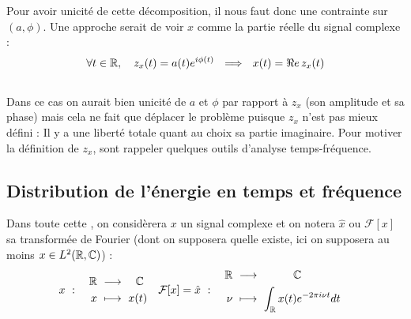 Pour avoir unicité de cette décomposition, il nous faut donc une contrainte sur $(a,\phi)$. Une approche serait de voir $x$ comme la partie réelle du signal complexe :
\[\forall t\in\R,\quad z_x(t) = a(t)e^{i\phi(t)}\ \ \Lr\ \ x(t) = \Re e\, z_x(t)\]
\\
Dans ce cas on aurait bien unicité de $a$ et $\phi$ par rapport à $z_x$ (son amplitude et sa phase) mais cela ne fait que déplacer le problème puisque $z_x$ n'est pas mieux défini : Il y a une liberté totale quant au choix sa partie imaginaire. Pour motiver la définition de $z_x$, sont rappeler quelques outils d'analyse temps-fréquence.



\subsection{Distribution de l'énergie en temps et fréquence}\label{subsec:distrib_temp-freq}

Dans toute cette , on considèrera $x$ un signal complexe et on notera $\hat{x}$ ou $\mathcal{F}[x]$ sa transformée de Fourier (dont on supposera quelle existe, ici on supposera au moins $x\in L^2(\mathbb{R}, \mathbb{C})$) :
\begin{align*}
	x\ &:\quad \begin{aligned}\R\ &\lr\quad \C \\ x\ &\longmapsto\ x(t)
	\end{aligned}  &  \mathcal{F}[x]=\hat{x}\ &:\quad \begin{aligned}\R\ &\lr\qquad\quad \C \\ \nu\ &\longmapsto\ \int_\R x(t)e^{-2\pi i \nu t}dt
	\end{aligned}
\end{align*}
\\

